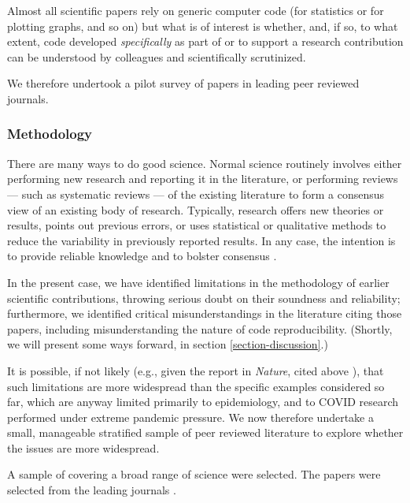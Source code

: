 Almost all scientific papers rely on generic computer code (for statistics or for plotting graphs, and so on) but what is of interest is whether, and, if so, to what extent, code developed \emph{specifically\/} as part of or to support a research contribution can be understood by colleagues and scientifically scrutinized. \begin{change}We therefore undertook a pilot survey of papers in leading peer reviewed journals.\end{change}

\subsubsection{Methodology}
\begin{change}
There are many ways to do good science. Normal science routinely involves either performing new research and reporting it in the literature, or performing reviews --- such as systematic reviews --- of the existing literature to form a consensus view of an existing body of research. Typically, research offers new theories or results, points out previous errors, or uses statistical or qualitative methods to reduce the variability in previously reported results. In any case, the intention is to provide reliable knowledge and to bolster consensus \cite{ziman}.

In the present case, we have identified limitations in the methodology of earlier scientific contributions, throwing serious doubt on their soundness and reliability; furthermore, we identified critical misunderstandings in the literature citing those papers, including misunderstanding the nature of code reproducibility. (Shortly, we will present some ways forward, in section \ref{section-discussion}.) 

It is possible, if not likely (e.g., given the report in \emph{Nature\/}, cited above \cite{nature-review}), that such limitations are more widespread than the specific examples considered so far, which are anyway limited primarily to epidemiology, and to COVID research performed under extreme pandemic pressure. We now therefore undertake a small, manageable stratified sample of peer reviewed literature to explore whether the issues are more widespread.
\end{change}

A sample of  covering a broad range of science were selected. The papers were selected from the leading journals \journalBreakdown. 


